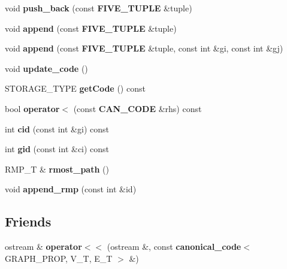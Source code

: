 \begin{CompactItemize}
\item 
void {\bf push\_\-back} (const  {\bf FIVE\_\-TUPLE} \&tuple)\label{classcanonical__code_3_01GRAPH__PROP_00_01V__T_00_01E__T_01_4_a12}

\item 
void {\bf append} (const  {\bf FIVE\_\-TUPLE} \&tuple)\label{classcanonical__code_3_01GRAPH__PROP_00_01V__T_00_01E__T_01_4_a13}

\item 
void {\bf append} (const  {\bf FIVE\_\-TUPLE} \&tuple, const  int \&gi, const  int \&gj)\label{classcanonical__code_3_01GRAPH__PROP_00_01V__T_00_01E__T_01_4_a14}

\item 
void {\bf update\_\-code} ()\label{classcanonical__code_3_01GRAPH__PROP_00_01V__T_00_01E__T_01_4_a15}

\item 
STORAGE\_\-TYPE {\bf get\-Code} () const \label{classcanonical__code_3_01GRAPH__PROP_00_01V__T_00_01E__T_01_4_a16}

\item 
bool {\bf operator$<$} (const  {\bf CAN\_\-CODE} \&rhs) const \label{classcanonical__code_3_01GRAPH__PROP_00_01V__T_00_01E__T_01_4_a17}

\item 
int {\bf cid} (const  int \&gi) const \label{classcanonical__code_3_01GRAPH__PROP_00_01V__T_00_01E__T_01_4_a18}

\item 
int {\bf gid} (const  int \&ci) const \label{classcanonical__code_3_01GRAPH__PROP_00_01V__T_00_01E__T_01_4_a19}

\item 
RMP\_\-T \& {\bf rmost\_\-path} ()\label{classcanonical__code_3_01GRAPH__PROP_00_01V__T_00_01E__T_01_4_a20}

\item 
void {\bf append\_\-rmp} (const  int \&id)\label{classcanonical__code_3_01GRAPH__PROP_00_01V__T_00_01E__T_01_4_a21}

\end{CompactItemize}
\subsection*{Friends}
\begin{CompactItemize}
\item 
ostream \& {\bf operator$<$$<$} (ostream \&, const  {\bf canonical\_\-code}$<$ GRAPH\_\-PROP, V\_\-T, E\_\-T $>$ \&)\label{classcanonical__code_3_01GRAPH__PROP_00_01V__T_00_01E__T_01_4_n0}

\end{CompactItemize}


